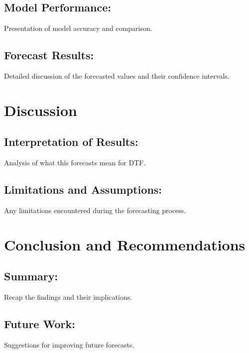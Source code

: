 \documentclass[11pt,a4paper,]{article}
\begin{document}
\subsection{Model Performance:}\label{model-performance}

Presentation of model accuracy and comparison.

\subsection{Forecast Results:}\label{forecast-results}

Detailed discussion of the forecasted values and their confidence intervals.

\section{Discussion}\label{discussion}

\subsection{Interpretation of Results:}\label{interpretation-of-results}

Analysis of what this forecasts mean for DTF.

\subsection{Limitations and Assumptions:}\label{limitations-and-assumptions}

Any limitations encountered during the forecasting process.

\section{Conclusion and Recommendations}\label{conclusion-and-recommendations}

\subsection{Summary:}\label{summary}

Recap the findings and their implications.

\subsection{Future Work:}\label{future-work}

Suggestions for improving future forecasts.
\end{document}
